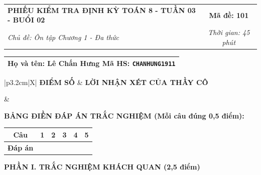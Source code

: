 \documentclass[12pt,a4paper]{article}
\begin{document}
\newpage



\noindent
\begin{tabularx}{\linewidth}{|X|c|}
\hline
\textbf{PHIẾU KIỂM TRA ĐỊNH KỲ TOÁN 8 - TUẦN 03 - BUỔI 02} & \textbf{Mã đề: 101} \\
\textit{Chủ đề: Ôn tập Chương 1 - Đa thức} & \textit{Thời gian: 45 phút} \\
\hline
\end{tabularx}

\vspace{1mm}

\noindent
\begin{tabularx}{\linewidth}{|X|}
\hline
\rule[-2mm]{0pt}{7.5mm}\textbf{Họ và tên:} \textbf{\large Lê Chấn Hưng} \hfill \textbf{Mã HS:} \texttt{CHANHUNG1911} \quad \\
\hline
\end{tabularx}

\vspace{1mm}

\noindent
\begin{tabularx}{\linewidth}{|p{3.2cm}|X|}
\hline
\centering\textbf{ĐIỂM SỐ} & \centering\textbf{LỜI NHẬN XÉT CỦA THẦY CÔ} \tabularnewline
\hline
\rule{0pt}{1.3cm} & \tabularnewline
\hline
\end{tabularx}

\vspace{1.2mm}

\noindent\textbf{BẢNG ĐIỀN ĐÁP ÁN TRẮC NGHIỆM (Mỗi câu đúng 0,5 điểm):}
\vspace{0.8mm}

\noindent
\renewcommand{\arraystretch}{1.35}
\begin{tabularx}{\linewidth}{|c|*{5}{>{\centering\arraybackslash}X|}}
\hline
\textbf{Câu} & \textbf{1} & \textbf{2} & \textbf{3} & \textbf{4} & \textbf{5} \\
\hline
\textbf{Đáp án} & & & & & \\
\hline
\end{tabularx}
\renewcommand{\arraystretch}{1.0}

\vspace{1.5mm}

\noindent\textbf{\large PHẦN I. TRẮC NGHIỆM KHÁCH QUAN (2,5 điểm)}
\vspace{1mm}
\end{document}
